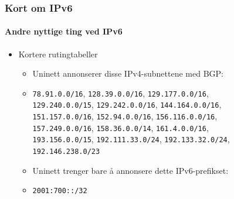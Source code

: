 \begin{frame}%
  \frametitle{Kort om IPv6}
  \framesubtitle{Andre nyttige ting ved IPv6}
  \begin{itemize}[<+->]
  \item Kortere rutingtabeller
    \begin{itemize}[<+->]
    \item Uninett annonserer disse IPv4-subnettene med BGP:
    \item \texttt{78.91.0.0/16}, \hfill\alert<4>{\texttt{128.39.0.0/16}}, \hfill\texttt{129.177.0.0/16},\\
      \texttt{129.240.0.0/15}, \hfill\texttt{129.242.0.0/16}, \hfill\texttt{144.164.0.0/16},\\
      \texttt{151.157.0.0/16}, \hfill\texttt{152.94.0.0/16}, \hfill\texttt{156.116.0.0/16},\\
      \texttt{157.249.0.0/16}, \hfill\texttt{158.36.0.0/14}, \hfill\texttt{161.4.0.0/16},\\
      \texttt{193.156.0.0/15}, \hfill\texttt{192.111.33.0/24}, \hfill\texttt{192.133.32.0/24},\\
      \hfill\texttt{192.146.238.0/23}\hfill\null
      \pause
    \item Uninett trenger bare å annonsere dette IPv6-prefikset:
    \item \texttt{2001:700::/32}
    \end{itemize}
  \end{itemize}
\end{frame}

